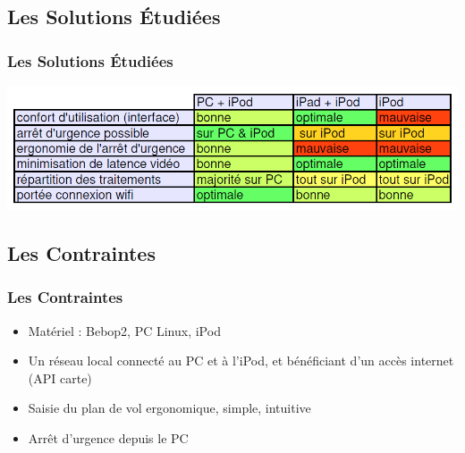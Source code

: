 \documentclass{beamer}
\begin{document}
	\begin{frame}
	\section{Les Solutions Étudiées}
		\begin{center}
		\frametitle{Les Solutions Étudiées}
        \includegraphics[scale=0.45]{comparatif_v2.PNG}
		\end{center}
	\end{frame}
	\begin{frame}
	\section{Les Contraintes}
		\begin{center}
		\frametitle{Les Contraintes}
           	\begin{itemize}
                \item Matériel : Bebop2, PC Linux, iPod
                \item Un réseau local connecté au PC et à l'iPod, et bénéficiant d'un accès internet (API carte)
                \item Saisie du plan de vol ergonomique, simple, intuitive
                \item Arrêt d'urgence depuis le PC
            \end{itemize}
		\end{center}
	\end{frame}
\end{document}
